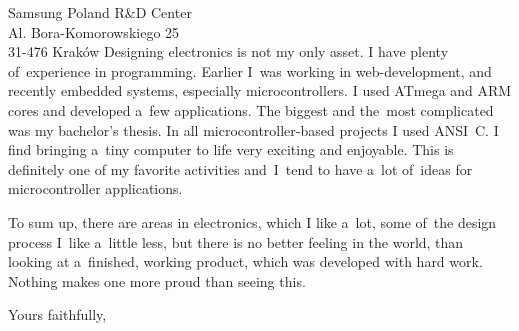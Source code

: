 \documentclass[a4paper, 12pt]{letter}
\begin{document}
\begin{letter}{Samsung Poland R\&D Center\\Al. Bora-Komorowskiego 25\\31-476 Kraków}
Designing electronics is not my only asset. I have plenty of~experience in programming. Earlier I~was working in web-development, and recently embedded systems, especially microcontrollers. I used ATmega and ARM cores and developed a~few applications. The biggest and the~most complicated was my bachelor's thesis. In all microcontroller-based projects I used ANSI~C. I find bringing a~tiny computer to life very exciting and enjoyable. This is definitely one of my favorite activities and~I~tend to have a~lot of~ideas for microcontroller applications.

To sum up, there are areas in electronics, which I like a~lot, some of~the design process I~like a~little less, but there is no better feeling in the world, than looking at a~finished, working product, which was developed with hard work. Nothing makes one more proud than seeing this.

\vspace{4\baselineskip}

\signature{\vspace{-3\baselineskip}Maciej Kopeć}

\closing{Yours faithfully,}


\end{letter}
\end{document}
